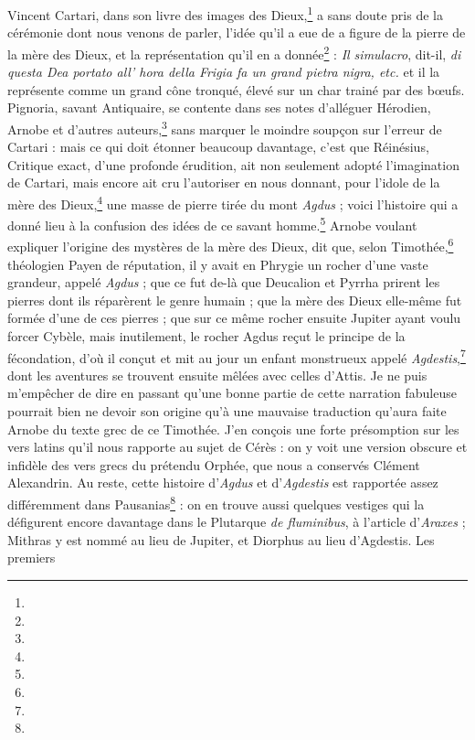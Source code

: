 \documentclass[a4paper, 11pt, oneside, polutonikogreek, french]{article}
\begin{document}
Vincent Cartari, dans son livre des images des Dieux,\footnote{} a sans doute pris de la cérémonie dont nous venons de parler, l'idée qu'il a eue de a figure de la pierre de la mère des Dieux, et la représentation qu'il en a donnée\footnote{} : \emph{Il simulacro}, dit-il, \emph{di questa Dea portato all' hora della Frigia fa un grand pietra nigra, etc.} et il la représente comme un grand cône tronqué, élevé sur un char trainé par des bœufs. Pignoria, savant Antiquaire, se contente dans ses notes d'alléguer Hérodien, Arnobe et d'autres auteurs,\footnote{} sans marquer le moindre soupçon sur l'erreur de Cartari : mais ce qui doit étonner beaucoup davantage, c'est que Réinésius, Critique exact, d'une profonde érudition, ait non seulement adopté l'imagination de Cartari, mais encore ait cru l'autoriser en nous donnant, pour l'idole de la mère des Dieux,\footnote{} une masse de pierre tirée du mont \emph{Agdus} ; voici l'histoire qui a donné lieu à la confusion des idées de ce savant homme.\footnote{} Arnobe voulant expliquer l'origine des mystères de la mère des Dieux, dit que, selon Timothée,\footnote{} théologien Payen de réputation, il y avait en Phrygie un rocher d'une vaste grandeur, appelé \emph{Agdus} ; que ce fut de-là que Deucalion et Pyrrha prirent les pierres dont ils réparèrent le genre humain ; que la mère des Dieux elle-même fut formée d'une de ces pierres ; que sur ce même rocher ensuite Jupiter ayant voulu forcer Cybèle, mais inutilement, le rocher Agdus reçut le principe de la fécondation, d'où il conçut et mit au jour un enfant monstrueux appelé \emph{Agdestis},\footnote{} dont les aventures se trouvent ensuite mêlées avec celles d'Attis. Je ne puis m'empêcher de dire en passant qu'une bonne partie de cette narration fabuleuse pourrait bien ne devoir son origine qu'à une mauvaise traduction qu'aura faite Arnobe du texte grec de ce Timothée. J'en conçois une forte présomption sur les vers latins qu'il nous rapporte au sujet de Cérès : on y voit une version obscure et infidèle des vers grecs du prétendu Orphée, que nous a conservés Clément Alexandrin. Au reste, cette histoire d'\emph{Agdus} et d'\emph{Agdestis} est rapportée assez différemment dans Pausanias\footnote{} : on en trouve aussi quelques vestiges qui la défigurent encore davantage dans le Plutarque \emph{de fluminibus}, à l'article d'\emph{Araxes} ; Mithras y est nommé au lieu de Jupiter, et Diorphus au lieu d'Agdestis. Les premiers 
\end{document}
